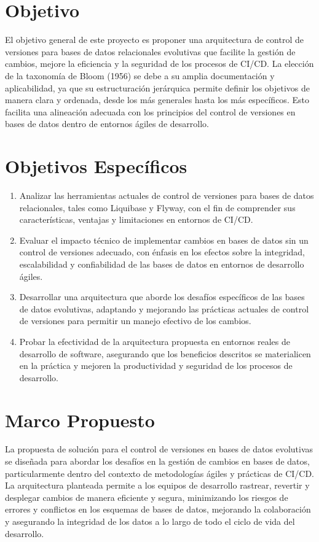\documentclass{IEEEtran}
\begin{document}
\section{Objetivo}
El objetivo general de este proyecto es proponer una arquitectura de control de versiones para bases de datos relacionales evolutivas que facilite la gestión de cambios, mejore la eficiencia y la seguridad de los procesos de CI/CD. La elección de la taxonomía de Bloom (1956) \cite{TBloom} se debe a su amplia documentación y aplicabilidad, ya que su estructuración jerárquica permite definir los objetivos de manera clara y ordenada, desde los más generales hasta los más específicos. Esto facilita una alineación adecuada con los principios del control de versiones en bases de datos dentro de entornos ágiles de desarrollo.

\section{Objetivos Específicos}
\begin{enumerate}
    \item Analizar las herramientas actuales de control de versiones para bases de datos relacionales, tales como Liquibase y Flyway, con el fin de comprender sus características, ventajas y limitaciones en entornos de CI/CD.
    \item Evaluar el impacto técnico de implementar cambios en bases de datos sin un control de versiones adecuado, con énfasis en los efectos sobre la integridad, escalabilidad y confiabilidad de las bases de datos en entornos de desarrollo ágiles.
    \item Desarrollar una arquitectura que aborde los desafíos específicos de las bases de datos evolutivas, adaptando y mejorando las prácticas actuales de control de versiones para permitir un manejo efectivo de los cambios.
    \item Probar la efectividad de la arquitectura propuesta en entornos reales de desarrollo de software, asegurando que los beneficios descritos se materialicen en la práctica y mejoren la productividad y seguridad de los procesos de desarrollo.
\end{enumerate}

\section{Marco Propuesto}
La propuesta de solución para el control de versiones en bases de datos evolutivas se diseñada para abordar los desafíos en la gestión de cambios en bases de datos, particularmente dentro del contexto de metodologías ágiles y prácticas de CI/CD. La arquitectura planteada permite a los equipos de desarrollo rastrear, revertir y desplegar cambios de manera eficiente y segura, minimizando los riesgos de errores y conflictos en los esquemas de bases de datos, mejorando la colaboración y asegurando la integridad de los datos a lo largo de todo el ciclo de vida del desarrollo.
\end{document}
